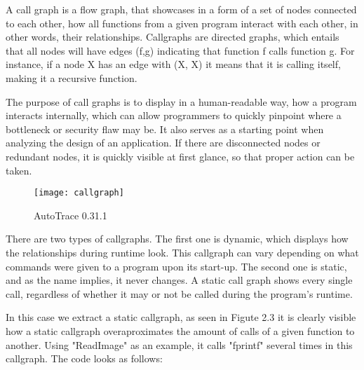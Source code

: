 A call graph is a flow graph, that showcases in a form of a set of nodes connected to each other, how all functions from a given program interact with each other, in other words, their relationships. Callgraphs are directed graphs, which entails that all nodes will have edges (f,g) indicating that function f calls function g. For instance, if a node X has an edge with (X, X) it means that it is calling itself, making it a recursive function.

The purpose of call graphs is to display in a human-readable way, how a program interacts internally, which can allow programmers to quickly pinpoint where a bottleneck or security flaw may be. It also serves as a starting point when analyzing the design of an application. If there are disconnected nodes or redundant nodes, it is quickly visible at first glance, so that proper action can be taken.

\begin{figure}[!htb]
	\caption{AutoTrace 0.31.1}
	\centering
	\texttt{[image: callgraph]}
\end{figure}

There are two types of callgraphs. The first one is dynamic, which displays how the relationships during runtime look. This callgraph can vary depending on what commands were given to a program upon its start-up. The second one is static, and as the name implies, it never changes. A static call graph shows every single call, regardless of whether it may or not be called during the program's runtime.\parencite{callgraphs}

In this case we extract a static callgraph, as seen in Figute 2.3 it is clearly visible how a static callgraph overaproximates the amount of calls of a given function to another. Using "ReadImage" as an example, it calls "fprintf" several times in this callgraph. The code looks as follows:

